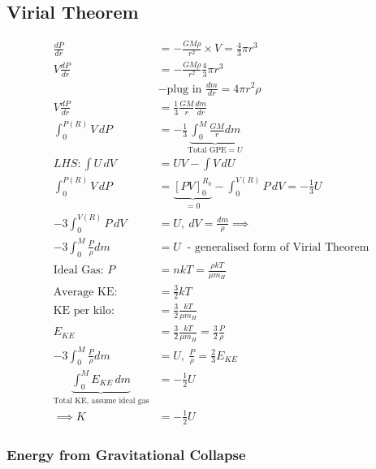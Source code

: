 \documentclass[a4paper,11pt,normalem]{article}
\begin{document}
\section{}
\subsection{Virial Theorem}

\[
    \begin{aligned}
        \frac{dP}{dr} &= -\frac{GM\rho}{r^2} \times V = \frac{4}{3}\pi r^3 \\
        V\frac{dP}{dr} &= -\frac{GM\rho}{r^2}\frac{4}{3}\pi r^3 \\
        &- \text{plug in }\frac{dm}{dr} = 4\pi r^2 \rho \\
        V\frac{dP}{dr} &= \frac{1}{3}\frac{GM}{r}\frac{dm}{dr} \\
        \int_{0}^{P(R)} V\,dP &= -\frac{1}{3} \underbrace{\int_{0}^{M} \frac{GM}{r}dm}_{\text{Total GPE} = U} \\
        LHS: \int U\,dV &= UV - \int V\,dU \\
        \int_{0}^{P(R)} V\,dP &= \underbrace{[PV]_{0}^{R_{0}}}_{= 0} - \int_{0}^{V(R)} P\,dV = -\frac{1}{3} U \\
        -3 \int_{0}^{V(R)} P\,dV &= U, ~ dV = \frac{dm}{\rho} \implies \\
        -3 \int_{0}^{M} \frac{P}{\rho} dm &= U ~ \text{ - generalised form of Virial Theorem} \\
        \text{Ideal Gas: } P &= nkT = \frac{\rho kT}{\mu m_{H}} \\
        \text{Average KE: } &= \frac{3}{2}kT \\
        \text{KE per kilo: } &= \frac{3}{2} \frac{kT}{\mu m_{H}} \\
        E_{KE} &= \frac{3}{2} \frac{kT}{\mu m_{H}} = \frac{3}{2}\frac{P}{\rho} \\
        -3 \int_{0}^{M}\frac{P}{\rho}dm &= U,~ \frac{P}{\rho} = \frac{2}{3}E_{KE} \\
        \underbrace{\int_{0}^{M} E_{KE} \,dm}_{\text{Total KE, assume ideal gas}} &= -\frac{1}{2} U \\
        \implies K &= -\frac{1}{2}U
    \end{aligned}
\]

\subsubsection{Energy from Gravitational
Collapse}\label{energy-from-gravitational-collapse}
\end{document}
